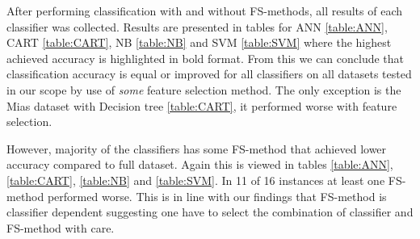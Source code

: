 After performing classification with and without FS-methods, all results of each classifier was collected. Results are presented in tables for ANN \ref{table:ANN}, CART \ref{table:CART}, NB \ref{table:NB} and SVM \ref{table:SVM} where the highest achieved accuracy is highlighted in bold format. From this we can conclude that classification accuracy is equal or improved for all classifiers on all datasets tested in our scope by use of \textit{some} feature selection method. The only exception is the Mias dataset with Decision tree \ref{table:CART}, it performed worse with feature selection.

However, majority of the classifiers has some FS-method that achieved lower accuracy compared to full dataset. Again this is viewed in tables \ref{table:ANN}, \ref{table:CART}, \ref{table:NB} and \ref{table:SVM}. In 11 of 16 instances at least one FS-method performed worse. This is in line with our findings that FS-method is classifier dependent suggesting one have to select the combination of classifier and FS-method with care.

\begin{table}[h]
  \centering
  
  \caption[]%
  {{\small Classification accuracy achieved by ANN was improved on all datasets by the use of some feature selection method.}}
  \label{table:ANN}
\end{table}

\begin{table}[h]
  \centering
   \\
  \caption[]%
  {{\small All datasets except MIAS benefited from feature selection using CART Decision Tree classifier.}}
  \label{table:CART}
\end{table}

\begin{table}[h]
  \centering
   \\
  \caption[]%
  {{\small Na\"ive Bayes sees improvement or equivalent accuracy by feature selection on every dataset.}}
  \label{table:NB}
\end{table}

\begin{table}[h]
  \centering
   \\
  \caption[]%
  {{\small Classification accuracy achieved by SVM was improved or equivalent on every dataset with use of feature selection.}}
  \label{table:SVM}
\end{table}

